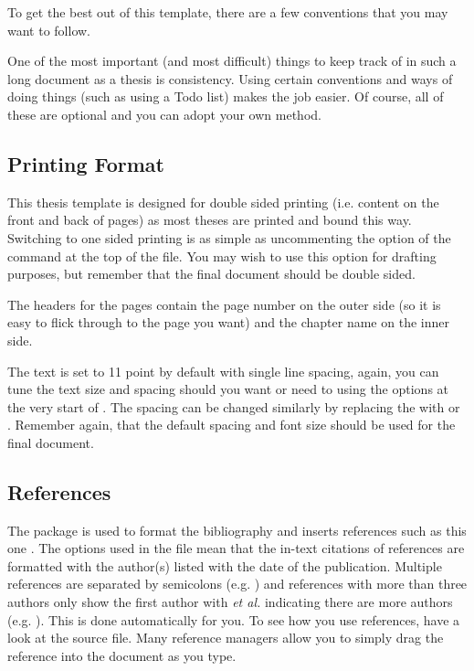 To get the best out of this template, there are a few conventions that you may want to follow.

One of the most important (and most difficult) things to keep track of in such a long document as a thesis is consistency. Using certain conventions and ways of doing things (such as using a Todo list) makes the job easier. Of course, all of these are optional and you can adopt your own method.

\subsection{Printing Format}

This thesis template is designed for double sided printing (i.e. content on the front and back of pages) as most theses are printed and bound this way. Switching to one sided printing is as simple as uncommenting the  option of the  command at the top of the  file. You may wish to use this option for drafting purposes, but remember that the final document should be double sided.

The headers for the pages contain the page number on the outer side (so it is easy to flick through to the page you want) and the chapter name on the inner side.

The text is set to 11 point by default with single line spacing, again, you can tune the text size and spacing should you want or need to using the options at the very start of . The spacing can be changed similarly by replacing the  with  or . Remember again, that the default spacing and font size should be used for the final document.

\subsection{References}

The  package is used to format the bibliography and inserts references such as this one \parencite{Reference1}. The options used in the  file mean that the in-text citations of references are formatted with the author(s) listed with the date of the publication. Multiple references are separated by semicolons (e.g. \parencite{Reference2, Reference1}) and references with more than three authors only show the first author with \emph{et al.} indicating there are more authors (e.g. \parencite{Reference3}). This is done automatically for you. To see how you use references, have a look at the  source file. Many reference managers allow you to simply drag the reference into the document as you type.

